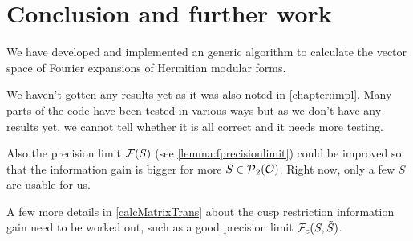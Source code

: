 
\section{Conclusion and further work}
\label{chapter:conclusion}

We have developed and implemented an generic algorithm to calculate the vector space of Fourier expansions of Hermitian modular forms.

We haven't gotten any results yet as it was also noted in \cref{chapter:impl}. Many parts of the code have been tested in various ways but as we don't have any results yet, we cannot tell whether it is all correct and it needs more testing.

Also the precision limit $\mathcal{F}(S)$ (see \cref{lemma:fprecisionlimit}) could be improved so that the information gain is bigger for more $S \in \operatorname{\mathcal{P}}_2(\mathcal{O})$. Right now, only a few $S$ are usable for us.

A few more details in \cref{calcMatrixTrans} about the cusp restriction information gain need to be worked out, such as a good precision limit $\mathcal{F}_c(S,\tilde{S})$.

